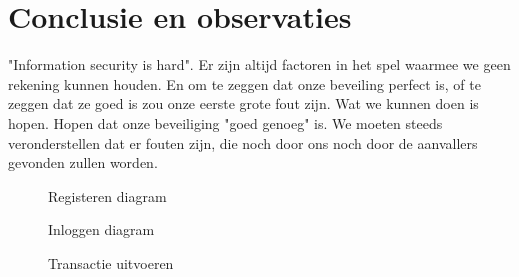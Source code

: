 \documentclass[11pt]{article}
\begin{document}
\section{Conclusie en observaties}
"Information security is hard". Er zijn altijd factoren in het spel waarmee we geen rekening kunnen houden. En om te zeggen dat onze beveiling perfect is, of te zeggen dat ze goed is zou onze eerste grote fout zijn. Wat we kunnen doen is hopen. Hopen dat onze beveiliging "goed genoeg" is. We moeten steeds veronderstellen dat er fouten zijn, die noch door ons noch door de aanvallers gevonden zullen worden.
\newpage
\begin{center}
\begin{figure}[h]
\caption{Registeren diagram}\label{fig:registeren}
\end{figure}
\begin{figure}[h]
\caption{Inloggen diagram}\label{fig:inloggen}
\end{figure}
\begin{figure}[h]
\caption{Transactie uitvoeren}\label{fig:transactie}
\end{figure}
\end{center}
\newpage
\end{document}
